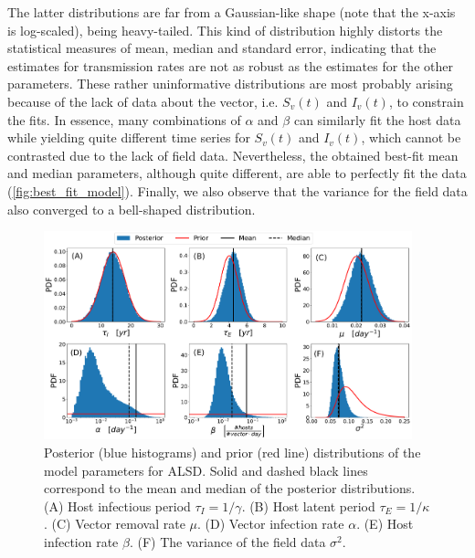 The latter distributions are far from a Gaussian-like shape (note that the
x-axis is log-scaled), being heavy-tailed. This kind of distribution highly
distorts the statistical measures of mean, median and standard error,
indicating that the estimates for transmission rates are not as robust as the
estimates for the other parameters. These rather uninformative distributions
are most probably arising because of the lack of data about the vector, i.e.
$S_v(t)$ and $I_v(t)$, to constrain the fits. In essence, many combinations of
$\alpha$ and $\beta$ can similarly fit the host data while yielding quite
different time series for $S_v(t)$ and $I_v(t)$, which cannot be contrasted due
to the lack of field data. Nevertheless, the obtained best-fit mean and median
parameters, although quite different, are able to perfectly fit the data
(\cref{fig:best_fit_model}). Finally, we also observe that the variance for the
field data also converged to a bell-shaped distribution.

\begin{figure}[H]
    \centering

    \includegraphics[width=0.95\textwidth]{Figures/Parameter_estimates_ALSD.pdf}
    \caption{Posterior (blue histograms) and prior (red line) distributions
        of the model parameters for ALSD. Solid and dashed black lines
        correspond to
        the mean and median of the posterior distributions. (A) Host infectious
        period
        $\tau_I=1/\gamma$. (B) Host latent period $\tau_E=1/\kappa$.  (C)
        Vector
        removal rate $\mu$. (D) Vector infection rate $\alpha$. (E) Host
        infection rate
        $\beta$. (F) The variance of the field data $\sigma^2$.}
    \label{fig:parameter_estimates_ALSD}
\end{figure}

